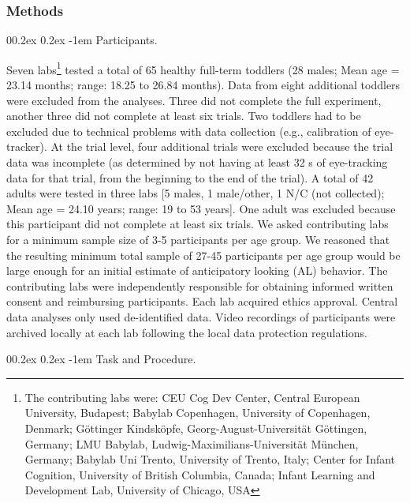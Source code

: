 \documentclass[
  man, donotrepeattitle,floatsintext]{apa6}
\makeatletter
\let\oldparagraph\paragraph
\renewcommand{\paragraph}{
    \@ifstar
      \xxxParagraphStar
      \xxxParagraphNoStar
  }
\newcommand{\xxxParagraphStar}[1]{\oldparagraph*{#1}\mbox{}}
\newcommand{\xxxParagraphNoStar}[1]{\oldparagraph{#1}\mbox{}}
\renewcommand{\paragraph}{\@startsection{paragraph}{4}{\parindent}%
  {0\baselineskip \@plus 0.2ex \@minus 0.2ex}%
  {-1em}%
  {\normalfont\normalsize\bfseries\itshape\typesectitle}}
\makeatother
\begin{document}
\subsubsection{Methods}\label{methods}

\paragraph{Participants.}\label{participants.}

Seven labs\footnote{The contributing labs were: CEU Cog Dev Center, Central European University, Budapest; Babylab Copenhagen, University of Copenhagen, Denmark; Göttinger Kindsköpfe, Georg-August-Universität Göttingen, Germany; LMU Babylab, Ludwig-Maximilians-Universität München, Germany; Babylab Uni Trento, University of Trento, Italy; Center for Infant Cognition, University of British Columbia, Canada; Infant Learning and Development Lab, University of Chicago, USA} tested a total of 65 healthy full-term toddlers (28 males; Mean age = 23.14 months; range: 18.25 to 26.84 months). Data from eight additional toddlers were excluded from the analyses. Three did not complete the full experiment, another three did not complete at least six trials. Two toddlers had to be excluded due to technical problems with data collection (e.g., calibration of eye-tracker). At the trial level, four additional trials were excluded because the trial data was incomplete (as determined by not having at least 32 s of eye-tracking data for that trial, from the beginning to the end of the trial). A total of 42 adults were tested in three labs {[}5 males, 1 male/other, 1 N/C (not collected); Mean age = 24.10 years; range: 19 to 53 years{]}. One adult was excluded because this participant did not complete at least six trials. We asked contributing labs for a minimum sample size of 3-5 participants per age group. We reasoned that the resulting minimum total sample of 27-45 participants per age group would be large enough for an initial estimate of anticipatory looking (AL) behavior. The contributing labs were independently responsible for obtaining informed written consent and reimbursing participants. Each lab acquired ethics approval. Central data analyses only used de-identified data. Video recordings of participants were archived locally at each lab following the local data protection regulations.

\paragraph{Task and Procedure.}\label{task-and-procedure.}
\end{document}
